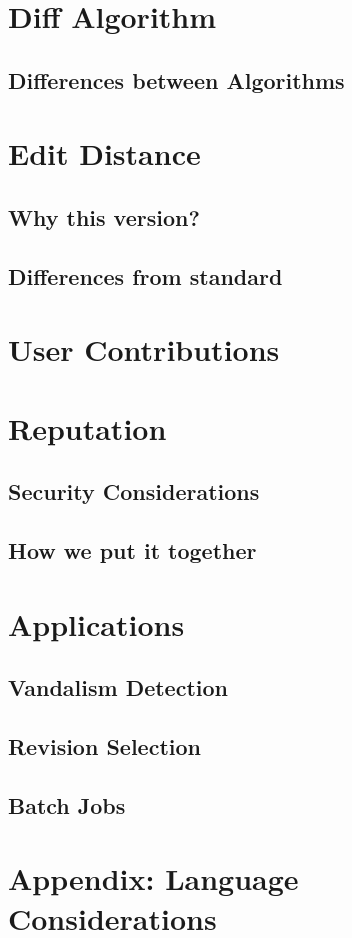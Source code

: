 \chapter{Diff Algorithm}
    \section{Differences between Algorithms}
\chapter{Edit Distance}
    \section{Why this version?}
    \section{Differences from standard}
\chapter{User Contributions}
\chapter{Reputation}
    \section{Security Considerations}
    \section{How we put it together}
\chapter{Applications}
    \section{Vandalism Detection}
    \section{Revision Selection}
    \section{Batch Jobs}
\chapter{Appendix: Language Considerations}
